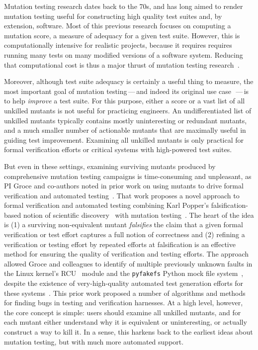 Mutation testing research dates back to the 70s, and has long aimed to render
mutation testing useful for constructing high quality
test suites and, by extension, software.
Most of this previous
research focuses on computing a mutation score, a measure of adequacy for a
given test suite.  However, this is computationally intensive for realistic
projects, because it requires requires running many tests on many modified
versions of a software system.  Reducing that computational cost is thus a major
thrust of mutation testing research~\cite{jia2011analysis}.

Moreover, although test suite adequacy is certainly a useful thing to measure, the most
important goal of mutation testing\,---\,and indeed its original use
case~\cite{budd1980theoretical}\,---\,is to help \emph{improve} a test suite.  For this
purpose, either a score or a vast list of all unkilled mutants is not useful for practicing engineers.  An
undifferentiated list of unkilled mutants typically contains mostly uninteresting or
redundant mutants, and a much smaller number of actionable mutants that are
maximally useful in guiding test improvement.  Examining all unkilled
mutants is only practical for formal verification efforts or critical
systems with high-powered test suites.

But even in these settings, examining
surviving mutants produced by comprehensive mutation testing campaigns is
time-consuming and unpleasant, as PI Groce and co-authors noted in prior work on
using mutants to drive formal verification and automated
testing~\cite{groce2015verified,groce2018verified,mutKernel}.
%
That work proposes a novel approach to
formal verification and automated testing
combining Karl Popper's falsification-based notion of
scientific discovery~\cite{Popper,popperconjectures} with mutation
testing~\cite{groce2015verified,groce2018verified,mutKernel}.
The heart of the idea is (1) a surviving non-equivalent mutant
\emph{falsifies} the claim that a given
formal verification or test effort captures a full notion of
correctness and (2) refining a
verification or testing effort by repeated efforts at falsification is an
effective method for ensuring the quality of verification and testing
efforts.  The
approach allowed Groce and colleagues to identify of multiple previously unknown faults in
the Linux kernel's
RCU~\cite{MathieuDesnoyers2012URCU,DinakarGuniguntala2008IBMSysJ,McKenney:2013:SDS:2483852.2483867}
module and the {\tt pyfakefs} Python mock file
system~\cite{pyfakefs}, despite the existence of very-high-quality
automated test generation efforts for these
systems~\cite{rcutorture,TSTL}.  This prior work
proposed a number of algorithms and
methods for finding bugs in testing and verification
harnesses.  At a high level, however,
the core concept is simple:  users should examine all unkilled
mutants, and for each mutant either understand why it is
equivalent or uninteresting, or actually construct a way to kill it.  In a sense, this harkens back to the
earliest ideas about mutation testing, but with
much more automated support.

